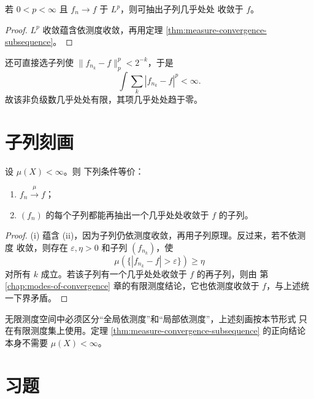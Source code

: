 \begin{corollary}[\(L^p\) 子列原理]
\label{cor:lp-ae-subsequence}
若 \(0<p<\infty\) 且 \(f_n\to f\) 于 \(L^p\)，则可抽出子列几乎处处
收敛于 \(f\)。
\end{corollary}

\begin{proof}
\(L^p\) 收敛蕴含依测度收敛，再用定理
\ref{thm:measure-convergence-subsequence}。
\end{proof}

还可直接选子列使
\(\|f_{n_k}-f\|_p^p<2^{-k}\)，于是
\[
 \int\sum_k|f_{n_k}-f|^p<\infty.
\]
故该非负级数几乎处处有限，其项几乎处处趋于零。

\section{子列刻画}

\begin{theorem}
\label{thm:measure-convergence-subsequence-characterization}
设 \(\mu(X)<\infty\)。则
下列条件等价：
\begin{enumerate}[label=\textup{(\roman*)}]
 \item \(f_n\xrightarrow{\mu}f\)；
 \item \((f_n)\) 的每个子列都能再抽出一个几乎处处收敛于 \(f\) 的子列。
\end{enumerate}
\end{theorem}

\begin{proof}
(i) 蕴含 (ii)，因为子列仍依测度收敛，再用子列原理。反过来，若不依测度
收敛，则存在 \(\varepsilon,\eta>0\) 和子列 \((f_{n_k})\)，使
\[
 \mu(\{|f_{n_k}-f|>\varepsilon\})\ge\eta
\]
对所有 \(k\) 成立。若该子列有一个几乎处处收敛于 \(f\) 的再子列，则由
第 \ref{chap:modes-of-convergence} 章的有限测度结论，它也依测度收敛于
\(f\)，与上述统一下界矛盾。
\end{proof}

\begin{remark}
无限测度空间中必须区分“全局依测度”和“局部依测度”，上述刻画按本节形式
只在有限测度集上使用。定理
\ref{thm:measure-convergence-subsequence} 的正向结论本身不需要
\(\mu(X)<\infty\)。
\end{remark}

\section*{习题}
